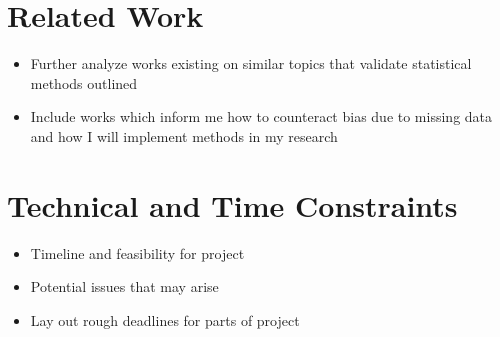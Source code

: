 \documentclass{article} %
\begin{document}
\section{Related Work}

\begin{itemize}
	\item Further analyze works existing on similar topics that validate statistical methods outlined
	\item Include works which inform me how to counteract bias due to missing data and how I will implement methods in my research
\end{itemize}


\section{Technical and Time Constraints}

\begin{itemize}
	\item Timeline and feasibility for project
	\item Potential issues that may arise
	\item Lay out rough deadlines for parts of project
\end{itemize}

\printbibliography
\
\end{document}
